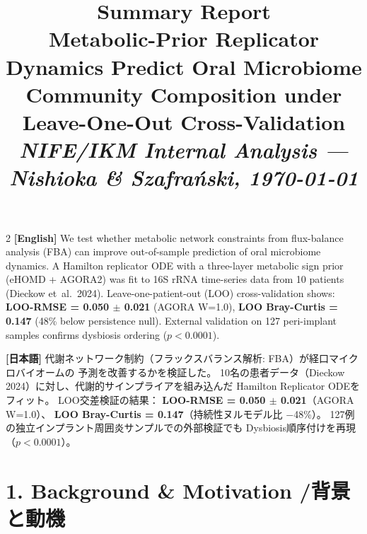 \documentclass[10pt,a4paper]{article}
\title{%
  \textbf{Summary Report}\\[4pt]
  \large Metabolic-Prior Replicator Dynamics Predict Oral Microbiome\\
  Community Composition under Leave-One-Out Cross-Validation\\[6pt]
  \normalsize \textit{NIFE/IKM Internal Analysis — Nishioka \& Szafra\'{n}ski, \today}
}
\author{}
\date{}
\begin{document}
\maketitle\thispagestyle{fancy}
\vspace{-1em}

\begin{tcolorbox}[colback=gray!8, colframe=gray!50, title=\textbf{Abstract / 要旨}]
\begin{multicols}{2}
\small
\textbf{[English]}
We test whether metabolic network constraints from flux-balance analysis (FBA)
can improve out-of-sample prediction of oral microbiome dynamics.
A Hamilton replicator ODE with a three-layer metabolic sign prior
(eHOMD + AGORA2) was fit to 16S rRNA time-series data from 10 patients
(Dieckow et~al.~2024).
Leave-one-patient-out (LOO) cross-validation shows:
\textbf{LOO-RMSE = 0.050 $\pm$ 0.021} (AGORA W=1.0),
\textbf{LOO Bray-Curtis = 0.147} (48\% below persistence null).
External validation on 127 peri-implant samples confirms dysbiosis ordering
($p < 0.0001$).

\columnbreak

\textbf{[日本語]}
代謝ネットワーク制約（フラックスバランス解析: FBA）が経口マイクロバイオームの
予測を改善するかを検証した。
10名の患者データ（Dieckow 2024）に対し、代謝的サインプライアを組み込んだ
Hamilton Replicator ODEをフィット。
LOO交差検証の結果：
\textbf{LOO-RMSE = 0.050 $\pm$ 0.021}（AGORA W=1.0）、
\textbf{LOO Bray-Curtis = 0.147}（持続性ヌルモデル比 $-$48\%）。
127例の独立インプラント周囲炎サンプルでの外部検証でも
Dysbiosis順序付けを再現（$p < 0.0001$）。
\end{multicols}
\end{tcolorbox}

\section{1. Background \& Motivation \quad /\quad 背景と動機}
\end{document}
